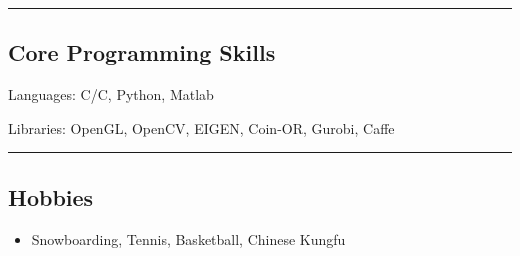 \documentclass[10pt,letterpaper]{article}
\newenvironment{indentsection}[1]%
{\begin{list}{}%
	{\setlength{\leftmargin}{#1}}%
	\item[]%
}
{\end{list}}
\newcommand{\CPP}
{C\nolinebreak[4]\hspace{-.05em}\raisebox{.22ex}{\footnotesize\bf ++}}
\begin{document}
\hrule
\vspace{-0.4em}
\subsection*{Core Programming Skills}

\begin{indentsection}{\parindent}
\begin{description*}
	\item[Languages:]
	C/\CPP, Python, Matlab
	\item[Libraries:]
    OpenGL, OpenCV, EIGEN, Coin-OR, Gurobi, Caffe
\end{description*}
\end{indentsection}

\hrule
\vspace{-0.4em}
\subsection*{Hobbies}
\begin{itemize}
\item Snowboarding, Tennis, Basketball, Chinese Kungfu
\end{itemize}
\end{document}
